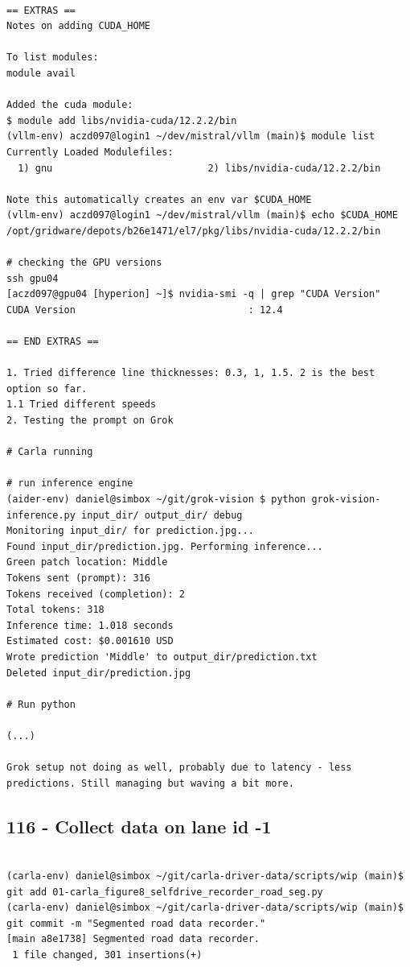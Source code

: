 \begin{verbatim}

== EXTRAS ==
Notes on adding CUDA_HOME

To list modules:
module avail

Added the cuda module:
$ module add libs/nvidia-cuda/12.2.2/bin
(vllm-env) aczd097@login1 ~/dev/mistral/vllm (main)$ module list
Currently Loaded Modulefiles:
  1) gnu                           2) libs/nvidia-cuda/12.2.2/bin

Note this automatically creates an env var $CUDA_HOME
(vllm-env) aczd097@login1 ~/dev/mistral/vllm (main)$ echo $CUDA_HOME
/opt/gridware/depots/b26e1471/el7/pkg/libs/nvidia-cuda/12.2.2/bin

# checking the GPU versions
ssh gpu04
[aczd097@gpu04 [hyperion] ~]$ nvidia-smi -q | grep "CUDA Version" 
CUDA Version                              : 12.4

== END EXTRAS ==

1. Tried difference line thicknesses: 0.3, 1, 1.5. 2 is the best option so far.
1.1 Tried different speeds
2. Testing the prompt on Grok

# Carla running

# run inference engine
(aider-env) daniel@simbox ~/git/grok-vision $ python grok-vision-inference.py input_dir/ output_dir/ debug
Monitoring input_dir/ for prediction.jpg...
Found input_dir/prediction.jpg. Performing inference...
Green patch location: Middle
Tokens sent (prompt): 316
Tokens received (completion): 2
Total tokens: 318
Inference time: 1.018 seconds
Estimated cost: $0.001610 USD
Wrote prediction 'Middle' to output_dir/prediction.txt
Deleted input_dir/prediction.jpg

# Run python

(...)

Grok setup not doing as well, probably due to latency - less predictions. Still managing but waving a bit more.

\end{verbatim}

\subsection{116 - Collect data on lane id -1}
\label{app_res:116}

\begin{verbatim}

(carla-env) daniel@simbox ~/git/carla-driver-data/scripts/wip (main)$ git add 01-carla_figure8_selfdrive_recorder_road_seg.py 
(carla-env) daniel@simbox ~/git/carla-driver-data/scripts/wip (main)$ git commit -m "Segmented road data recorder."
[main a8e1738] Segmented road data recorder.
 1 file changed, 301 insertions(+)
 
\end{verbatim}

